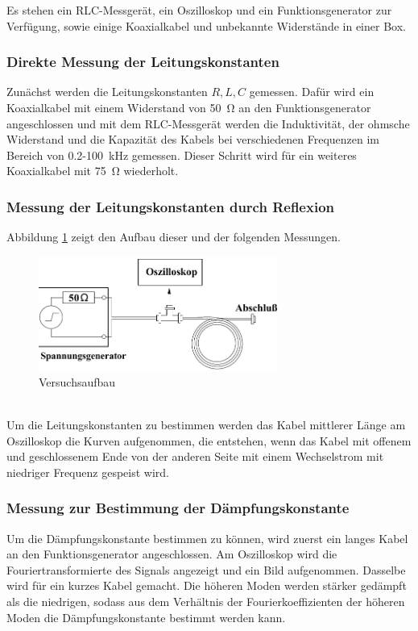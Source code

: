 Es stehen ein RLC-Messgerät, ein Oszilloskop und ein Funktionsgenerator zur Ver\-fü\-gung, sowie einige Koaxialkabel und unbekannte Widerstände in einer Box.
\subsubsection*{Direkte Messung der Leitungskonstanten}
Zunächst werden die Leitungskonstanten $R,L,C$ gemessen. Dafür wird ein Koaxialkabel mit einem Widerstand von \SI{50}{\ohm} an den Funktionsgenerator angeschlossen und mit dem RLC-Messgerät werden die Induktivität, der ohmsche Widerstand und die Kapazität des Kabels bei verschiedenen Frequenzen im Bereich von 0.2-\SI{100}{\kilo\hertz} gemessen. Dieser Schritt wird für ein weiteres Koaxialkabel mit \SI{75}{\ohm} wiederholt.
\subsubsection*{Messung der Leitungskonstanten durch Reflexion}
Abbildung \ref{fig:Aufbau} zeigt den Aufbau dieser und der folgenden Messungen.
\begin{figure}[h]
	\centering
	\includegraphics[width=0.7\textwidth]{Aufbau.pdf}
	\caption{Versuchsaufbau \cite{E2}}
	\label{fig:Aufbau}
\end{figure} \\
Um die Leitungskonstanten zu bestimmen werden das Kabel mittlerer Länge am Oszilloskop die Kurven aufgenommen, die entstehen, wenn das Kabel mit offenem und geschlossenem Ende von der anderen Seite mit einem Wechselstrom mit niedriger Frequenz gespeist wird.

\subsubsection*{Messung zur Bestimmung der Dämpfungskonstante}
Um die Dämpfungskonstante bestimmen zu können, wird zuerst ein langes Kabel an den Funktionsgenerator angeschlossen. Am Oszilloskop wird die Fouriertransformierte des Signals angezeigt und ein Bild aufgenommen. Dasselbe wird für ein kurzes Kabel gemacht. Die höheren Moden werden stärker gedämpft als die niedrigen, sodass aus dem Verhältnis der Fourierkoeffizienten der höheren Moden die Dämpfungskonstante bestimmt werden kann.
